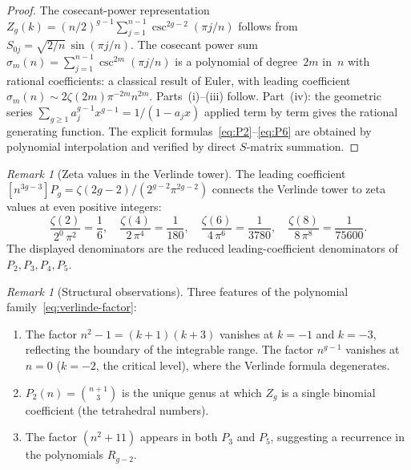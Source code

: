 \documentclass[11pt,reqno]{amsart}
\theoremstyle{definition}
\theoremstyle{remark}
\newtheorem{remark}[theorem]{Remark}
\numberwithin{equation}{section}
\begin{document}
\begin{proof}
  The cosecant-power representation
  $Z_g(k) = (n/2)^{g-1}\sum_{j=1}^{n-1}
  \csc^{2g-2}(\pi j/n)$
  follows from $S_{0j} = \sqrt{2/n}\,\sin(\pi j/n)$. The
  cosecant power sum
  $\sigma_m(n) = \sum_{j=1}^{n-1}\csc^{2m}(\pi j/n)$
  is a polynomial of degree~$2m$ in~$n$ with rational coefficients:
  a classical result of Euler, with leading coefficient
  $\sigma_m(n) \sim 2\zeta(2m)\pi^{-2m}n^{2m}$.
  Parts~(i)--(iii) follow. Part~(iv): the geometric series
  $\sum_{g \ge 1} a_j^{g-1} x^{g-1} = 1/(1 - a_j x)$ applied
  term by term gives the rational generating function. The explicit
  formulas~\eqref{eq:P2}--\eqref{eq:P6} are obtained by polynomial
  interpolation and verified by direct $S$-matrix summation.
\end{proof}

\begin{remark}[Zeta values in the Verlinde tower]
  \label{rem:zeta-values}
  The leading coefficient
  $[n^{3g-3}]P_g = \zeta(2g-2)/(2^{g-2}\pi^{2g-2})$ connects the
  Verlinde tower to zeta values at even positive integers:
  \[
    \frac{\zeta(2)}{2^0\,\pi^2} = \frac{1}{6},
    \quad
    \frac{\zeta(4)}{2\,\pi^4} = \frac{1}{180},
    \quad
    \frac{\zeta(6)}{4\,\pi^6} = \frac{1}{3780},
    \quad
    \frac{\zeta(8)}{8\,\pi^8} = \frac{1}{75600}.
  \]
  The displayed denominators are the reduced leading-coefficient
  denominators of $P_2,P_3,P_4,P_5$.
\end{remark}

\begin{remark}[Structural observations]
  \label{rem:verlinde-structure}
  Three features of the polynomial
  family~\eqref{eq:verlinde-factor}:
  \begin{enumerate}[label=\textup{(\alph*)}]
  \item The factor $n^2 - 1 = (k+1)(k+3)$ vanishes at
    $k = -1$ and $k = -3$, reflecting the boundary of the
    integrable range. The factor $n^{g-1}$ vanishes at $n = 0$
    ($k = -2$, the critical level), where the Verlinde formula
    degenerates.
  \item $P_2(n) = \binom{n+1}{3}$ is the unique genus at which
    $Z_g$ is a single binomial coefficient (the tetrahedral
    numbers).
  \item The factor $(n^2 + 11)$ appears in both $P_3$ and $P_5$,
    suggesting a recurrence in the polynomials $R_{g-2}$.
  \end{enumerate}
\end{remark}
\end{document}
